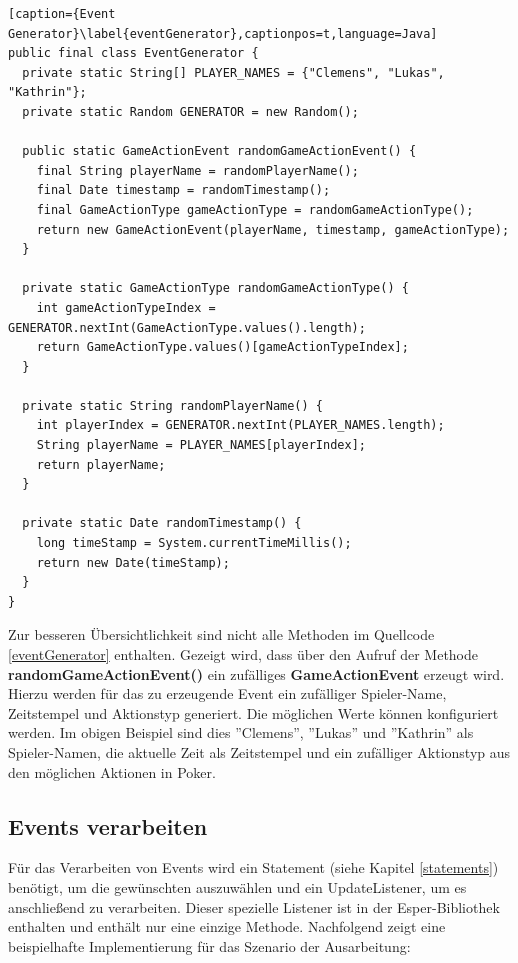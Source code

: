\begin{lstlisting}[caption={Event Generator}\label{eventGenerator},captionpos=t,language=Java]
public final class EventGenerator {
  private static String[] PLAYER_NAMES = {"Clemens", "Lukas", "Kathrin"};
  private static Random GENERATOR = new Random();
  
  public static GameActionEvent randomGameActionEvent() {
    final String playerName = randomPlayerName();
    final Date timestamp = randomTimestamp();
    final GameActionType gameActionType = randomGameActionType();
    return new GameActionEvent(playerName, timestamp, gameActionType);
  }

  private static GameActionType randomGameActionType() {
    int gameActionTypeIndex = GENERATOR.nextInt(GameActionType.values().length);
    return GameActionType.values()[gameActionTypeIndex];
  }

  private static String randomPlayerName() {
    int playerIndex = GENERATOR.nextInt(PLAYER_NAMES.length);
    String playerName = PLAYER_NAMES[playerIndex];
    return playerName;
  }

  private static Date randomTimestamp() {
    long timeStamp = System.currentTimeMillis();
    return new Date(timeStamp);
  }
}
\end{lstlisting}

Zur besseren Übersichtlichkeit sind nicht alle Methoden im Quellcode \ref{eventGenerator} enthalten.
Gezeigt wird, dass über den Aufruf der Methode \textbf{randomGameActionEvent()} ein zufälliges \textbf{GameActionEvent} erzeugt wird. Hierzu werden für das zu erzeugende Event ein zufälliger Spieler-Name, Zeitstempel und Aktionstyp generiert. Die möglichen Werte können konfiguriert werden. Im obigen Beispiel sind dies ''Clemens'', ''Lukas'' und ''Kathrin'' als Spieler-Namen, die aktuelle Zeit als Zeitstempel und ein zufälliger Aktionstyp aus den möglichen Aktionen in Poker.

\subsection{Events verarbeiten}
\label{EventsVerarbeiten}
Für das Verarbeiten von Events wird ein Statement (siehe Kapitel \ref{statements}) benötigt, um die gewünschten auszuwählen und ein UpdateListener, um es anschließend zu verarbeiten. Dieser spezielle Listener ist in der Esper-Bibliothek enthalten und enthält nur eine einzige Methode. Nachfolgend zeigt eine beispielhafte Implementierung für das Szenario der Ausarbeitung:

